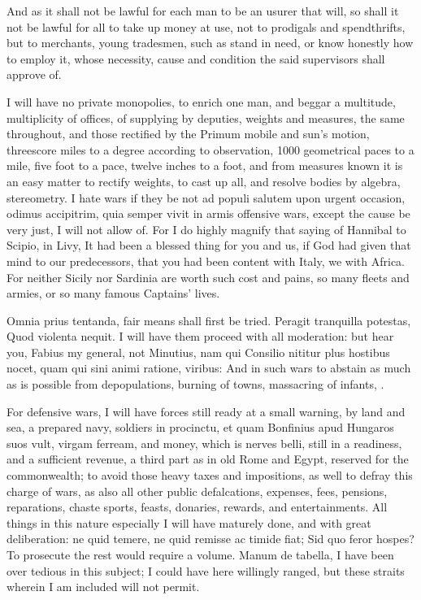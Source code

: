 {And as it shall not be lawful for each man to be an usurer that
will, so shall it not be lawful for all to take up money at use, not to
prodigals and spendthrifts, but to merchants, young tradesmen, such as
stand in need, or know honestly how to employ it, whose necessity,
cause and condition the said supervisors shall approve of.

I will have no private monopolies, to enrich one man, and beggar a
multitude, multiplicity of offices, of supplying by deputies,
weights and measures, the same throughout, and those rectified by the
Primum mobile and sun's motion, threescore miles to a degree according
to observation, 1000 geometrical paces to a mile, five foot to a pace,
twelve inches to a foot, \etc{} and from measures known it is an easy
matter to rectify weights, \etc{} to cast up all, and resolve bodies by
algebra, stereometry. I hate wars if they be not ad populi salutem upon
urgent occasion, odimus accipitrim, quia semper vivit in armis
 offensive wars, except the cause be very just, I will not allow
of. For I do highly magnify that saying of Hannibal to Scipio, in
Livy, It had been a blessed thing for you and us, if God had given
that mind to our predecessors, that you had been content with Italy, we
with Africa. For neither Sicily nor Sardinia are worth such cost and
pains, so many fleets and armies, or so many famous Captains' lives.

Omnia prius tentanda, fair means shall first be tried. Peragit
tranquilla potestas, Quod violenta nequit. I will have them proceed
with all moderation: but hear you, Fabius my general, not Minutius, nam
qui Consilio nititur plus hostibus nocet, quam qui sini animi
ratione, viribus: And in such wars to abstain as much as is possible
from depopulations, burning of towns, massacring of infants, \etc{}.

For defensive wars, I will have forces still ready at a small warning,
by land and sea, a prepared navy, soldiers in procinctu, et quam
Bonfinius apud Hungaros suos vult, virgam ferream, and money,
which is nerves belli, still in a readiness, and a sufficient revenue,
a third part as in old Rome and Egypt, reserved for the
commonwealth; to avoid those heavy taxes and impositions, as well to
defray this charge of wars, as also all other public defalcations,
expenses, fees, pensions, reparations, chaste sports, feasts, donaries,
rewards, and entertainments. All things in this nature especially I
will have maturely done, and with great deliberation: ne quid
 temere, ne quid remisse ac timide fiat; Sid quo feror hospes? To
prosecute the rest would require a volume. Manum de tabella, I have
been over tedious in this subject; I could have here willingly ranged,
but these straits wherein I am included will not permit.

}
